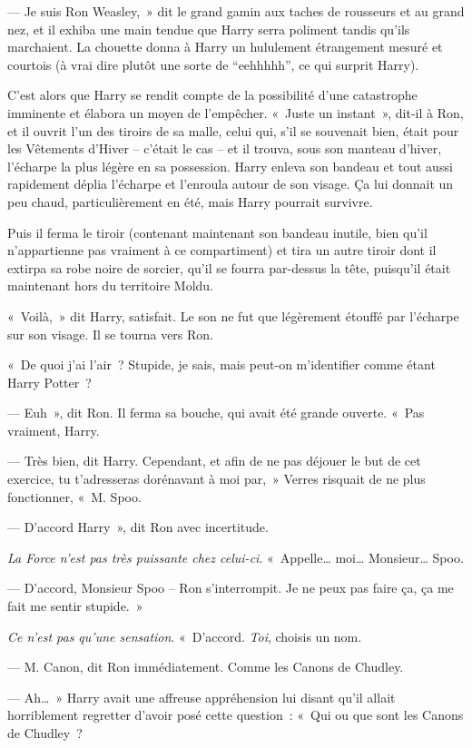 --- Je suis Ron Weasley,~» dit le grand gamin aux taches de rousseurs et au grand nez, et il exhiba une main tendue que Harry serra poliment tandis qu'ils marchaient. La chouette donna à Harry un hululement étrangement mesuré et courtois (à vrai dire plutôt une sorte de “eehhhhh”, ce qui surprit Harry).

C'est alors que Harry se rendit compte de la possibilité d'une catastrophe imminente et élabora un moyen de l'empêcher. «~Juste un instant~», dit-il à Ron, et il ouvrit l'un des tiroirs de sa malle, celui qui, s'il se souvenait bien, était pour les Vêtements d'Hiver -- c'était le cas -- et il trouva, sous son manteau d'hiver, l'écharpe la plus légère en sa possession. Harry enleva son bandeau et tout aussi rapidement déplia l'écharpe et l'enroula autour de son visage. Ça lui donnait un peu chaud, particulièrement en été, mais Harry pourrait survivre.

Puis il ferma le tiroir (contenant maintenant son bandeau inutile, bien qu'il n'appartienne pas vraiment à ce compartiment) et tira un autre tiroir dont il extirpa sa robe noire de sorcier, qu'il se fourra par-dessus la tête, puisqu'il était maintenant hors du territoire Moldu.

«~Voilà,~» dit Harry, satisfait. Le son ne fut que légèrement étouffé par l'écharpe sur son visage. Il se tourna vers Ron.

«~De quoi j'ai l'air~? Stupide, je sais, mais peut-on m'identifier comme étant Harry Potter~?

--- Euh~», dit Ron. Il ferma sa bouche, qui avait été grande ouverte. «~Pas vraiment, Harry.

--- Très bien, dit Harry. Cependant, et afin de ne pas déjouer le but de cet exercice, tu t'adresseras dorénavant à moi par,~» Verres risquait de ne plus fonctionner, «~M. Spoo.

--- D'accord Harry~», dit Ron avec incertitude.

\emph{La Force n'est pas très puissante chez celui-ci}. «~Appelle… moi… Monsieur… Spoo.

--- D'accord, Monsieur Spoo -- Ron s'interrompit. Je ne peux pas faire ça, ça me fait me sentir stupide.~»

\emph{Ce n'est pas qu'une sensation}. «~D'accord. \emph{Toi}, choisis un nom.

--- M. Canon, dit Ron immédiatement. Comme les Canons de Chudley.

--- Ah…~» Harry avait une affreuse appréhension lui disant qu'il allait horriblement regretter d'avoir posé cette question~: «~Qui ou que sont les Canons de Chudley~?

